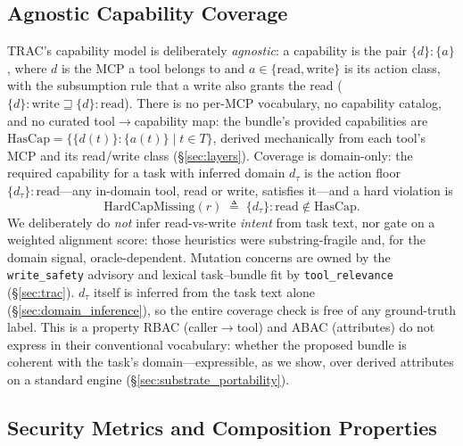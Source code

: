 \documentclass[sigconf,review,anonymous]{acmart}
\begin{document}
\subsection{Agnostic Capability Coverage}
\label{sec:capability}
\label{sec:alignment}

TRAC's capability model is deliberately \emph{agnostic}: a capability is the pair $\{d\}{:}\{a\}$, where $d$ is the MCP a tool belongs to and $a\in\{\textrm{read},\textrm{write}\}$ is its action class, with the subsumption rule that a write also grants the read ($\{d\}{:}\textrm{write}\sqsupseteq\{d\}{:}\textrm{read}$). There is no per-MCP vocabulary, no capability catalog, and no curated tool$\to$capability map: the bundle's provided capabilities are $\mathrm{HasCap}=\{\{d(t)\}{:}\{a(t)\}\mid t\in T\}$, derived mechanically from each tool's MCP and its read/write class (\S\ref{sec:layers}). Coverage is domain-only: the required capability for a task with inferred domain $d_\tau$ is the action floor $\{d_\tau\}{:}\textrm{read}$---any in-domain tool, read or write, satisfies it---and a hard violation is
\begin{equation}
\mathrm{HardCapMissing}(r)\;\triangleq\;\{d_\tau\}{:}\textrm{read}\notin\mathrm{HasCap}.
\label{eq:hardcap}
\end{equation}
We deliberately do \emph{not} infer read-vs-write \emph{intent} from task text, nor gate on a weighted alignment score: those heuristics were substring-fragile and, for the domain signal, oracle-dependent. Mutation concerns are owned by the \texttt{write\_safety} advisory and lexical task--bundle fit by \texttt{tool\_relevance} (\S\ref{sec:trac}). $d_\tau$ itself is inferred from the task text alone (\S\ref{sec:domain_inference}), so the entire coverage check is free of any ground-truth label. This is a property RBAC (caller$\to$tool) and ABAC (attributes) do not express in their conventional vocabulary: whether the proposed bundle is coherent with the task's domain---expressible, as we show, over derived attributes on a standard engine (\S\ref{sec:substrate_portability}).

\subsection{Security Metrics and Composition Properties}
\label{sec:security_metrics}
\label{sec:composition_properties}
\end{document}

